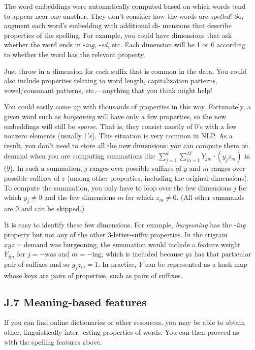 \documentclass[12pt]{article}
\theoremstyle{plain}
\theoremstyle{definition}
\theoremstyle{remark}
\begin{document}
The word embeddings were automatically computed based on which words tend to appear near one another. 
They don’t consider how the words are \emph{spelled}! So, augment each word’s embedding with additional di-
mensions that describe properties of the spelling. For example, you could have dimensions that ask whether 
the word ends in -\emph{ing}, -\emph{ed}, etc. Each dimension will be 1 or 0 according to whether the word has the 
relevant property. 

Just throw in a dimension for each suffix that is common in the data. You could also include properties 
relating to word length, capitalization patterns, vowel/consonant patterns, etc.—anything that you think 
might help! 

You could easily come up with thousands of properties in this way. Fortunately, a given word such as 
\emph{burgeoning} will have only a few properties, so the new embeddings will still be \emph{sparse}. That is, they consist 
mostly of 0’s with a few nonzero elements (usually 1’s). This situation is very common in NLP. As a result, 
you don’t need to store all the new dimensions: you can compute them on demand when you are computing 
summations like $\sum_{j=1}^d \sum_{m=1}^M Y_{jm}\cdot(y_j z_m)$ in (9). In such a summation, $j$ ranges over possible suffixes of 
$y$ and $m$ ranges over possible suffixes of $z$ (among other properties, including the original dimensions). To 
compute the summation, you only have to loop over the few dimensions $j$ for which $y_j \neq 0$ and the few 
dimensions $m$ for which $z_m \neq 0$. (All other summands are 0 and can be skipped.) 

It is easy to identify these few dimensions. For example, \emph{burgeoning} has the -\emph{ing} property but 
not any of the other 3-letter-suffix properties. In the trigram $xyz = \text{demand was burgeoning}$, the 
summation would include a feature weight $Y_{jm}$ for $j = -\text{was}$ and $m = -\text{ing}$, which is included because 
$yz$ has that particular pair of suffixes and so $y_j z_m = 1$. In practice, $Y$ can be represented as a hash map 
whose keys are pairs of properties, such as pairs of suffixes.

\subsection*{J.7 Meaning-based features}

If you can find online dictionaries or other resources, you may be able to obtain other, linguistically inter-
esting properties of words. You can then proceed as with the spelling features above.
\end{document}
